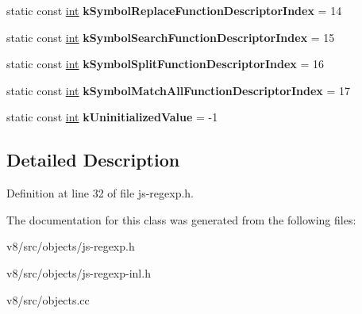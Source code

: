 \begin{DoxyCompactItemize}
\item 
\mbox{\label{classv8_1_1internal_1_1JSRegExp_a4b5bd38da8ff9685832def39fc06d690}} 
static const \mbox{\hyperlink{classint}{int}} {\bfseries k\+Symbol\+Replace\+Function\+Descriptor\+Index} = 14
\item 
\mbox{\label{classv8_1_1internal_1_1JSRegExp_af2ded96be2536ca367e60062703fe1f6}} 
static const \mbox{\hyperlink{classint}{int}} {\bfseries k\+Symbol\+Search\+Function\+Descriptor\+Index} = 15
\item 
\mbox{\label{classv8_1_1internal_1_1JSRegExp_a8ac12e0dd2c2960b119ad2a122d6bf3f}} 
static const \mbox{\hyperlink{classint}{int}} {\bfseries k\+Symbol\+Split\+Function\+Descriptor\+Index} = 16
\item 
\mbox{\label{classv8_1_1internal_1_1JSRegExp_ab3246b7a344bd66cb9edf7db0de16547}} 
static const \mbox{\hyperlink{classint}{int}} {\bfseries k\+Symbol\+Match\+All\+Function\+Descriptor\+Index} = 17
\item 
\mbox{\label{classv8_1_1internal_1_1JSRegExp_a0b4c665fbb52801f03a418dda10b8891}} 
static const \mbox{\hyperlink{classint}{int}} {\bfseries k\+Uninitialized\+Value} = -\/1
\end{DoxyCompactItemize}


\subsection{Detailed Description}


Definition at line 32 of file js-\/regexp.\+h.



The documentation for this class was generated from the following files\+:\begin{DoxyCompactItemize}
\item 
v8/src/objects/js-\/regexp.\+h\item 
v8/src/objects/js-\/regexp-\/inl.\+h\item 
v8/src/objects.\+cc\end{DoxyCompactItemize}
